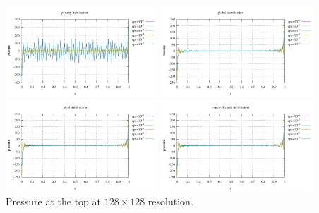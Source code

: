 \begin{center}
\includegraphics[width=5.7cm]{python_codes/fieldstone_115/results/ldc/psurf_penalty.pdf}
\includegraphics[width=5.7cm]{python_codes/fieldstone_115/results/ldc/psurf_global.pdf}\\
\includegraphics[width=5.7cm]{python_codes/fieldstone_115/results/ldc/psurf_local.pdf}
\includegraphics[width=5.7cm]{python_codes/fieldstone_115/results/ldc/psurf_macro.pdf}\\
{\captionfont Pressure at the top at $128\times 128$ resolution.}
\end{center}

